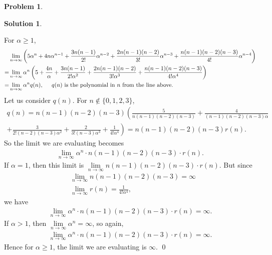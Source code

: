 \documentclass{article}
\theoremstyle{definition}
\newtheorem*{prob*}{Problem}
\newtheorem*{sln*}{Solution}
\begin{document}
\begin{prob*}
\begin{sln*}
\begin{enumerate}
			For $\alpha \geq 1$,
			\begin{align*}
			&\lim\limits_{n\to \infty} \left(    5\alpha^n + 4n\alpha^{n-1} + \frac{3n(n-1)}{2!}\alpha^{n-2} + \frac{2n(n-1)(n-2)}{3!}\alpha^{n-3} + \frac{n(n-1)(n-2)(n-3)}{4!}\alpha^{n-4} \right)\\
			= & \lim\limits_{n\to \infty}\alpha^n  \left(    5 + \frac{4n}{\alpha} + \frac{3n(n-1)}{2!\alpha^2} + \frac{2n(n-1)(n-2)}{3!\alpha^3} + \frac{n(n-1)(n-2)(n-3)}{4!\alpha^4} \right)\\
			= & \lim\limits_{n\to\infty} \alpha^n q(n), \hspace{0.5cm}\text{$q(n)$ is the polynomial in $n$ from the line above.}
			\end{align*}
			Let us consider $q(n)$. For $n \notin \{0,1,2,3 \}$,
			\begin{align*}
			q(n) = n(n-1)(n-2)(n-3)\left( \frac{5}{n(n-1)(n-2)(n-3)} + \frac{4}{(n-1)(n-2)(n-3)\alpha} \right. \\\left.+ \frac{3}{2!(n-2)(n-3)\alpha^2} + \frac{2}{3!(n-3)\alpha^3} + \frac{1}{4!\alpha^4}\right) = n(n-1)(n-2)(n-3)r(n).
			\end{align*}
			So the limit we are evaluating becomes
			\begin{align*}
			\lim\limits_{n\to\infty}\alpha^n \cdot n(n-1)(n-2)(n-3) \cdot r(n).
			\end{align*}
			If $\alpha = 1$, then this limit is $\lim\limits_{n\to\infty}n(n-1)(n-2)(n-3)\cdot r(n)$. But since
			\begin{align*}
			&\lim\limits_{n\to\infty}n(n-1)(n-2)(n-3) = \infty\\
			&\lim\limits_{n\to\infty}r(n) = \frac{1}{4!\alpha^4},
			\end{align*}
			we have
			\begin{align*}
			\lim\limits_{n\to\infty}\alpha^n \cdot n(n-1)(n-2)(n-3) \cdot r(n) = \infty.
			\end{align*}
			If $\alpha > 1$, then $\lim\limits_{n\to\infty}\alpha^n = \infty$, so again,
			\begin{align*}
			\lim\limits_{n\to\infty}\alpha^n \cdot n(n-1)(n-2)(n-3) \cdot r(n) = \infty.
			\end{align*}
			Hence for $\alpha \geq 1$, the limit we are evaluating is $\infty$. \qed
			
			\newpage
			

\end{enumerate}
\end{sln*}
\end{prob*}
\end{document}
